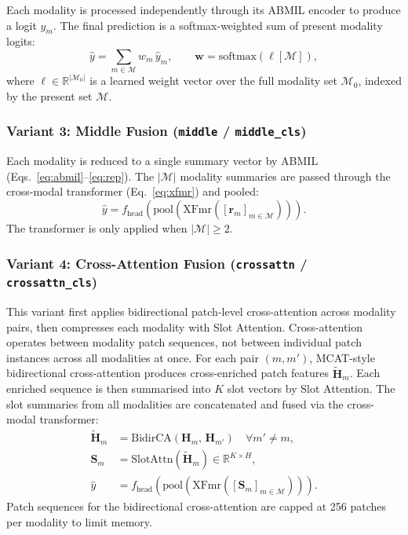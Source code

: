 \documentclass[11pt,a4paper]{article}
\begin{document}
Each modality is processed independently through its ABMIL encoder to produce
a logit $\hat{y}_m$.
The final prediction is a softmax-weighted sum of present modality logits:
\begin{equation}
    \hat{y} = \sum_{m\in\mathcal{M}} w_m\,\hat{y}_m,\qquad
    \mathbf{w} = \text{softmax}\!\left(\boldsymbol{\ell}[\mathcal{M}]\right),
    \label{eq:late}
\end{equation}
where $\boldsymbol{\ell}\in\mathbb{R}^{|\mathcal{M}_0|}$ is a learned weight
vector over the full modality set $\mathcal{M}_0$, indexed by the present set
$\mathcal{M}$.

\subsubsection{Variant 3: Middle Fusion (\texttt{middle} / \texttt{middle\_cls})}

Each modality is reduced to a single summary vector by ABMIL
(Eqs.~\eqref{eq:abmil}--\eqref{eq:rep}).
The $|\mathcal{M}|$ modality summaries are passed through the cross-modal
transformer (Eq.~\eqref{eq:xfmr}) and pooled:
\begin{equation}
    \hat{y} = f_\text{head}\!\left(
        \text{pool}\!\left(\mathrm{XFmr}\!\left(
            [\mathbf{r}_m]_{m\in\mathcal{M}}
        \right)\right)\right).
    \label{eq:middle}
\end{equation}
The transformer is only applied when $|\mathcal{M}|\geq 2$.

\subsubsection{Variant 4: Cross-Attention Fusion (\texttt{crossattn} / \texttt{crossattn\_cls})}

This variant first applies bidirectional patch-level cross-attention across
modality pairs, then compresses each modality with Slot Attention.
Cross-attention operates between modality patch sequences, not between
individual patch instances across all modalities at once.
For each pair $(m, m')$, MCAT-style~\cite{chen2021mcat} bidirectional
cross-attention produces cross-enriched patch features $\tilde{\mathbf{H}}_m$.
Each enriched sequence is then summarised into $K$ slot vectors by Slot
Attention.
The slot summaries from all modalities are concatenated and fused via the
cross-modal transformer:
\begin{align}
    \tilde{\mathbf{H}}_m &= \text{BidirCA}(\mathbf{H}_m,\, \mathbf{H}_{m'})
        \quad \forall m'\neq m, \\
    \mathbf{S}_m &= \text{SlotAttn}(\tilde{\mathbf{H}}_m)
        \in\mathbb{R}^{K\times H}, \\
    \hat{y} &= f_\text{head}\!\left(
        \text{pool}\!\left(
            \mathrm{XFmr}\!\left(
                [\mathbf{S}_m]_{m\in\mathcal{M}}
            \right)
        \right)\right).
\end{align}
Patch sequences for the bidirectional cross-attention are capped at 256 patches
per modality to limit memory.
\end{document}
